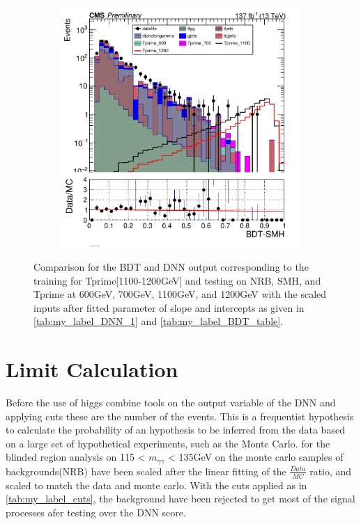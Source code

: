 \begin{figure}[H]
\begin{subfigure}[b]{0.47\textwidth}
         \includegraphics[width=\textwidth]{BDT_Output/Stacked_plot_BDT_1100-1200_with_diphoton_cuts_with_scaled_inputs.pdf}
         \label{fig:three sin x}
     \end{subfigure}
    \hfill
     \label{fig:}
     \caption{Comparison for the BDT and DNN output corresponding to the training for Tprime[1100-1200GeV] and testing on NRB, SMH, and Tprime at 600GeV, 700GeV, 1100GeV, and 1200GeV with the scaled inputs after fitted parameter of slope and intercepts as given in \autoref{tab:my_label_DNN_1} and \autoref{tab:my_label_BDT_table}.}
\end{figure}








 \section{Limit Calculation}\label{sec:limit_Ca}
Before the use of higgs combine tools on the output variable of the DNN and applying cuts these are the number of the events. This is a frequentist hypothesis to calculate the probability of an hypothesis to be inferred from the data based on a large set of hypothetical experiments, such as the Monte Carlo. 
for the blinded region analysis on 115 < $m_{\gamma\gamma}$ < 135GeV on the monte carlo samples of backgrounds(NRB) have been scaled after the linear fitting of the $\frac{Data}{MC}$ ratio, and scaled to match the data and monte carlo. 
With the cuts applied as in \autoref{tab:my_label_cuts}, the background have been rejected to get most of the signal processes afer testing over the DNN score. 


